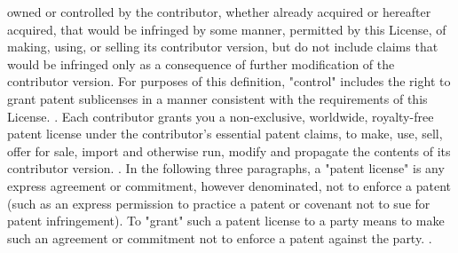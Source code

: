 \begin{script}
 owned or controlled by the contributor, whether already acquired or
 hereafter acquired, that would be infringed by some manner, permitted
 by this License, of making, using, or selling its contributor version,
 but do not include claims that would be infringed only as a
 consequence of further modification of the contributor version.  For
 purposes of this definition, "control" includes the right to grant
 patent sublicenses in a manner consistent with the requirements of
 this License.
 .
   Each contributor grants you a non-exclusive, worldwide, royalty-free
 patent license under the contributor's essential patent claims, to
 make, use, sell, offer for sale, import and otherwise run, modify and
 propagate the contents of its contributor version.
 .
   In the following three paragraphs, a "patent license" is any express
 agreement or commitment, however denominated, not to enforce a patent
 (such as an express permission to practice a patent or covenant not to
 sue for patent infringement).  To "grant" such a patent license to a
 party means to make such an agreement or commitment not to enforce a
 patent against the party.
 .
\end{script}
